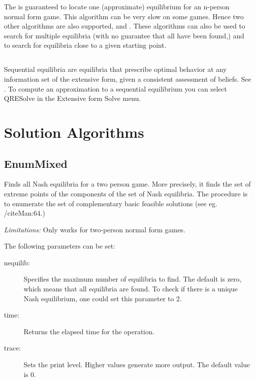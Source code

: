 {The 
 is guaranteed to locate one (approximate) equilibrium 
for an n-person normal form game.  This algorithm can be 
very slow on some games.  Hence two other algorithms are also supported, 
 and 
.  
These algorithms can also be used to search for multiple equilibria (with no 
guarantee that all have been found,) and to search for equilibria close to a given 
starting point. 

\subsection{}\label{seqnashsec}
Sequential equilibria are equilibria that prescribe optimal behavior at any 
information set of the extensive form, given a consistent assessment of 
beliefs.  See \cite{KrepsWilson:1982}.  To compute an approximation to a 
sequential equilibrium you can select QRESolve in the Extensive form Solve 
menu. 

\section{Solution Algorithms}\label{SolutionAlgorithms}

\subsection{EnumMixed}\label{EnumMixed}
Finds all Nash equilibria for a two person game.  More
precisely, it finds the set of extreme points of the components
of the set of Nash equilibria.  The procedure is to enumerate the set
of complementary basic feasible solutions (see eg. /cite{Man:64}.)

{\em Limitations:}  Only works for two-person normal form games. 

The following parameters can be set:

\begin{description}
\item[nequilib:] Specifies the maximum number of equilibria to find.  The
default is zero, which means that all equilibria are found.  To check if
there is a unique Nash equilibrium, one could set this parameter to 2.
\item[time:] Returns the elapsed time for the operation.
\item[trace:] Sets the print level.  Higher values generate more output.
The default value is 0.
\end{description}

}
